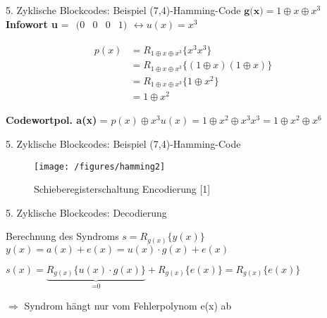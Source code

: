 \documentclass[ngerman]{beamer}
\begin{document}
\begin{frame}{5. Zyklische Blockcodes: Beispiel (7,4)-Hamming-Code}
	$\textbf{g(x)} = 1 \oplus x \oplus x^{3} $\newline
	\textbf{Infowort u} = $\begin{matrix}(0&0&0&1)\end{matrix} \leftrightarrow u(x) = x^{3}$\newline


\begin{align*}
	p(x) & = R_{1 \oplus x \oplus x^{3}}\{x^{3} x^{3}\} \\
	 & = R_{1 \oplus x \oplus x^{3}}\{(1 \oplus x) (1 \oplus x)\} \\
	 & = R_{1 \oplus x \oplus x^{3}}\{1 \oplus x^{2}\} \\
	 & = 1 \oplus x^{2}
	\end{align*}

\textbf{Codewortpol. a(x)} = $ p(x) \oplus x^{3}  u(x) = 1 \oplus x^{2} \oplus x^{3} x^{3} = 1 \oplus x^{2} \oplus x^{6}$

\end{frame}


\begin{frame}{5. Zyklische Blockcodes: Beispiel (7,4)-Hamming-Code}

	\begin{figure}[htbp]
 		\texttt{[image: /figures/hamming2]}
 			\caption{Schieberegisterschaltung Encodierung [1]}
	\end{figure}
\end{frame}



\begin{frame}{5. Zyklische Blockcodes: Decodierung}

	 Berechnung des \alert{Syndroms} $s = R_{g(x)} \{y(x)\}$\newline\newline
	$ y(x) = a(x) + e(x) = u(x) \cdot g(x) + e(x)$ \newline

	$ s(x) = \underbrace{R_{g(x)} \{u(x) \cdot g(x)\}}_\text{=0} +  R_{g(x)} \{e(x)\} = R_{g(x)} \{e(x)\}$\newline\newline

	$ \Rightarrow $ Syndrom hängt nur vom \alert{Fehlerpolynom e(x)} ab\newline



\end{frame}
\end{document}
